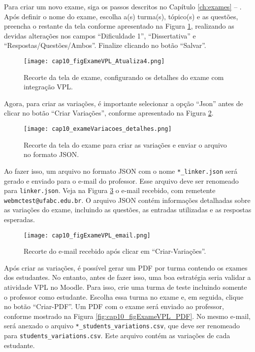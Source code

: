 Para criar um novo exame, siga os passos descritos no Capítulo \ref{ch:exames} -- . Após definir o nome do exame, escolha a(s) turma(s), tópico(s) e as questões, preencha o restante da tela conforme apresentado na Figura \ref{fig:cap10_figExameVPL_Atualiza4}, realizando as devidas alterações nos campos  ``Dificuldade 1'', ``Dissertativa'' e ``Respostas/Questões/Ambos''. Finalize clicando no botão ``Salvar''.

\begin{figure}[htbp]
  \centering
  \texttt{[image: cap10\_figExameVPL\_Atualiza4.png]}
  \caption{Recorte da tela de exame, configurando os detalhes do exame com integração VPL.}
  \label{fig:cap10_figExameVPL_Atualiza4}
\end{figure}

Agora, para criar as variações, é importante selecionar a opção ``Json'' antes de clicar no botão ``Criar Variações'', conforme apresentado na Figura \ref{fig:cap10_exameVariacoes_detalhes}.

\begin{figure}[!ht]
  \centering
    \texttt{[image: cap10\_exameVariacoes\_detalhes.png]}
    \caption{Recorte da tela do exame para criar as variações e enviar o arquivo no formato JSON.}
    \label{fig:cap10_exameVariacoes_detalhes}
  \end{figure}

Ao fazer isso, um arquivo no formato JSON com o nome \verb|*_linker.json| será gerado e enviado para o e-mail do professor. Esse arquivo deve ser renomeado para \verb|linker.json|. Veja na Figura \ref{fig:cap10_figExameVPL_email} o e-mail recebido, com remetente \verb|webmctest@ufabc.edu.br|. O arquivo JSON contém informações detalhadas sobre as variações do exame, incluindo as questões, as entradas utilizadas e as respostas esperadas.

\begin{figure}[htbp]
  \centering
  \texttt{[image: cap10\_figExameVPL\_email.png]}
   \caption{Recorte do e-mail recebido após clicar em ``Criar-Variações''.}
  \label{fig:cap10_figExameVPL_email}
\end{figure}

Após criar as variações, é possível gerar um PDF por turma contendo os exames dos estudantes. No entanto, antes de fazer isso, uma boa estratégia seria validar a atividade VPL no Moodle. Para isso, crie uma turma de teste incluindo somente o professor como estudante. Escolha essa turma no exame e, em seguida, clique no botão ``Criar-PDF''. Um PDF com o exame será enviado ao professor, conforme mostrado na Figura \ref{fig:cap10_figExameVPL_PDF}.
No mesmo e-mail, será anexado o arquivo \verb|*_students_variations.csv|, que deve ser renomeado para \verb|students_variations.csv|. Este arquivo contém as variações de cada estudante.

